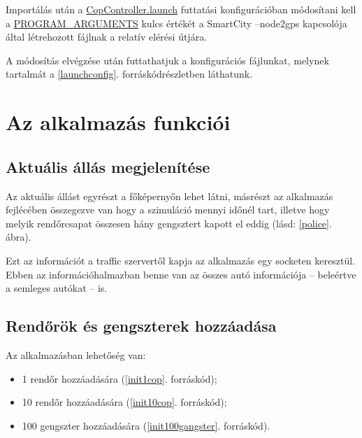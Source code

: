 \documentclass[a4paper,12pt]{report}
\begin{document}
Importálás után a \url{CopController.launch} futtatási konfigurációban módosítani kell a \url{PROGRAM_ARGUMENTS} kulcs értékét a SmartCity --node2gps kapcsolója által létrehozott fájlnak a relatív elérési útjára.

\vspace{2mm}
A módosítás elvégzése után futtathatjuk a konfigurációs fájlunkat, melynek tartalmát a \ref{launchconfig}. forráskódrészletben láthatunk.



\section{Az alkalmazás funkciói}
\label{functions}

\subsection{Aktuális állás megjelenítése}
\label{actualstate}

Az aktuális állást egyrészt a főképernyőn lehet látni, másrészt az alkalmazás fejlécében összegezve van hogy a szimuláció mennyi időnél tart, illetve hogy melyik rendőrcsapat összesen hány gengsztert kapott el eddig (lásd: \ref{police}. ábra).

\vspace{2mm}
Ezt az információt a traffic szervertől kapja az alkalmazás egy socketen keresztül. Ebben az információhalmazban benne van az összes autó információja -- beleértve a semleges autókat -- is.

\subsection{Rendőrök és gengszterek hozzáadása}
\label{addcops}

Az alkalmazásban lehetőség van:

\begin{itemize}
\item 1 rendőr hozzáadására (\ref{init1cop}. forráskód);
\item 10 rendőr hozzáadására (\ref{init10cop}. forráskód);
\item 100 gengszter hozzáadására (\ref{init100gangster}. forráskód).
\end{itemize}


\end{document}
